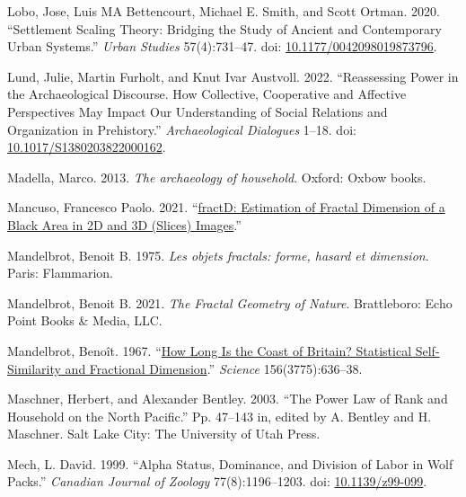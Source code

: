 \documentclass[
  12pt,
]{book}
\newlength{\cslhangindent}
\newlength{\cslentryspacingunit} %
\newenvironment{CSLReferences}[2] %
 {%
  \setlength{\parindent}{0pt}
  \ifodd #1
  \let\oldpar\par
  \def\par{\hangindent=\cslhangindent\oldpar}
  \fi
  \setlength{\parskip}{#2\cslentryspacingunit}
 }%
 {}
\begin{document}
\begin{CSLReferences}{1}{0}
\leavevmode{}%
Lobo, Jose, Luis MA Bettencourt, Michael E. Smith, and Scott Ortman. 2020. {``Settlement Scaling Theory: Bridging the Study of Ancient and Contemporary Urban Systems.''} \emph{Urban Studies} 57(4):731--47. doi: \href{https://doi.org/10.1177/0042098019873796}{10.1177/0042098019873796}.

\leavevmode{}%
Lund, Julie, Martin Furholt, and Knut Ivar Austvoll. 2022. {``Reassessing Power in the Archaeological Discourse. How Collective, Cooperative and Affective Perspectives May Impact Our Understanding of Social Relations and Organization in Prehistory.''} \emph{Archaeological Dialogues} 1--18. doi: \href{https://doi.org/10.1017/S1380203822000162}{10.1017/S1380203822000162}.

\leavevmode{}%
Madella, Marco. 2013. \emph{The archaeology of household}. Oxford: Oxbow books.

\leavevmode{}%
Mancuso, Francesco Paolo. 2021. {``\href{https://CRAN.R-project.org/package=fractD}{fractD: Estimation of Fractal Dimension of a Black Area in 2D and 3D (Slices) Images}.''}

\leavevmode{}%
Mandelbrot, Benoit B. 1975. \emph{Les objets fractals: forme, hasard et dimension}. Paris: Flammarion.

\leavevmode{}%
Mandelbrot, Benoit B. 2021. \emph{The Fractal Geometry of Nature}. Brattleboro: Echo Point Books \& Media, LLC.

\leavevmode{}%
Mandelbrot, Benoît. 1967. {``\href{https://www.jstor.org/stable/1721427}{How Long Is the Coast of Britain? Statistical Self-Similarity and Fractional Dimension}.''} \emph{Science} 156(3775):636--38.

\leavevmode{}%
Maschner, Herbert, and Alexander Bentley. 2003. {``The Power Law of Rank and Household on the North Pacific.''} Pp. 47--143 in, edited by A. Bentley and H. Maschner. Salt Lake City: The University of Utah Press.

\leavevmode{}%
Mech, L. David. 1999. {``Alpha Status, Dominance, and Division of Labor in Wolf Packs.''} \emph{Canadian Journal of Zoology} 77(8):1196--1203. doi: \href{https://doi.org/10.1139/z99-099}{10.1139/z99-099}.


\end{CSLReferences}
\end{document}
